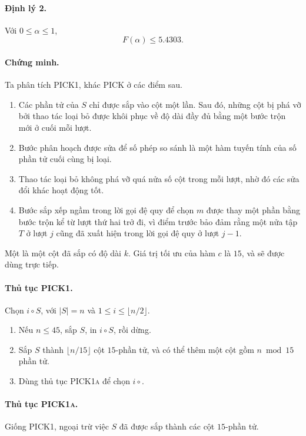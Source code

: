 \documentclass[11pt]{article}
\newcommand{\PICK}{\textsc{PICK}}
\newcommand{\PICKone}{\textsc{PICK1}}
\newcommand{\PICKonea}{\textsc{PICK1a}}
\begin{document}
\paragraph{Định lý 2.}
Với \(0\le\alpha\le 1\),
\[
  F(\alpha)\le 5.4303.
\]

\paragraph{Chứng minh.}
Ta phân tích \PICKone, khác \PICK{} ở các điểm sau.

\begin{enumerate}
  \item Các phần tử của \(S\) chỉ được sắp vào cột một lần. Sau đó, những cột
  bị phá vỡ bởi thao tác loại bỏ được khôi phục về độ dài đầy đủ bằng một
  bước trộn mới ở cuối mỗi lượt.
  \item Bước phân hoạch được sửa để số phép so sánh là một hàm tuyến tính của
  số phần tử cuối cùng bị loại.
  \item Thao tác loại bỏ không phá vỡ quá nửa số cột trong mỗi lượt, nhờ đó
  các sửa đổi khác hoạt động tốt.
  \item Bước sắp xếp ngầm trong lời gọi đệ quy để chọn \(m\) được thay một
  phần bằng bước trộn kể từ lượt thứ hai trở đi, vì điểm trước bảo đảm rằng
  một nửa tập \(T\) ở lượt \(j\) cũng đã xuất hiện trong lời gọi đệ quy ở lượt
  \(j-1\).
\end{enumerate}

Một  là một cột đã sắp có độ dài \(k\). Giá trị tối ưu của
hàm \(c\) là \(15\), và sẽ được dùng trực tiếp.

\paragraph{Thủ tục \PICKone.}
Chọn \(i\circ S\), với \(|S|=n\) và \(1\le i\le\lfloor n/2\rfloor\).

\begin{enumerate}
  \item Nếu \(n\le 45\), sắp \(S\), in \(i\circ S\), rồi dừng.
  \item Sắp \(S\) thành \(\lfloor n/15\rfloor\) cột \(15\)-phần tử, và có thể
  thêm một cột gồm \(n\bmod 15\) phần tử.
  \item Dùng thủ tục \PICKonea{} để chọn \(i\circ\).
\end{enumerate}

\paragraph{Thủ tục \PICKonea.}
Giống \PICKone, ngoại trừ việc \(S\) đã được sắp thành các cột \(15\)-phần tử.
\end{document}
